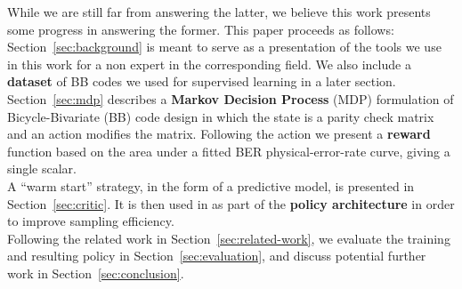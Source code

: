 \noindent While we are still far from answering the latter, we believe this work presents some progress in answering the former. This paper proceeds as follows:\\
Section~\ref{sec:background} is meant to serve as a presentation of the tools we use in this work for a non expert in the corresponding field. We also include a \textbf{dataset} of BB codes we used for supervised learning in a later section.\\
Section~\ref{sec:mdp} describes a \textbf{Markov Decision Process} (MDP) formulation of Bicycle-Bivariate (BB) code design in which the state is a parity check matrix and an action modifies the matrix. Following the action we present a \textbf{reward} function based on the area under a fitted BER physical-error-rate curve, giving a single scalar.\\
\noindent A ``warm start'' strategy, in the form of a predictive model, is presented in Section~\ref{sec:critic}. It is then used in as part of the \textbf{policy architecture} in order to improve sampling efficiency.\\
\noindent Following the related work in Section~\ref{sec:related-work}, we evaluate the training and resulting policy in Section~\ref{sec:evaluation}, and discuss potential further work in Section~\ref{sec:conclusion}.